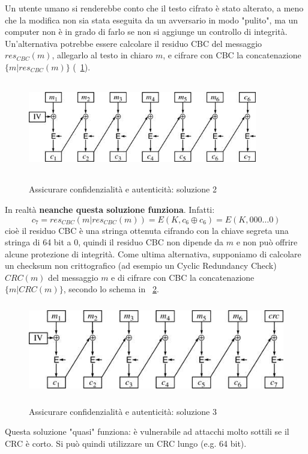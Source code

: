 \newline \newline
Un utente umano si renderebbe conto che il testo cifrato è stato alterato, a meno che la modifica non sia stata eseguita da un avversario in modo "pulito", ma un computer non è in grado di farlo se non si aggiunge un controllo di integrità.
\newline \newline
Un'alternativa potrebbe essere calcolare il residuo CBC del messaggio $res_{CBC}(m)$, allegarlo al testo in chiaro $m$, e cifrare con CBC la concatenazione $\{ m|res_{CBC}(m) \}$ (\figurename ~\ref{fig:residuo_CBC_2}).
\begin{figure}[htbp]
	\centering%
	\subfigure%
	{\includegraphics[height=4cm, width=10cm, keepaspectratio]{Immagini/modalita_operative/residuo_CBC_2.png}}
	\caption{Assicurare confidenzialità e autenticità: soluzione 2 \label{fig:residuo_CBC_2}} 	
\end{figure}
In realtà \textbf{neanche questa soluzione funziona}. Infatti: 
\begin{equation}
c_{7} = res_{CBC}(m|res_{CBC}(m)) = E(K, c_{6} \oplus c_{6}) = E(K, 000 … 0)
\end{equation}
cioè il residuo CBC è una stringa ottenuta cifrando con la chiave segreta una stringa di 64 bit a 0, quindi il residuo CBC non dipende da $m$ e non può offrire alcune protezione di integrità.
\newline \newline
Come ultima alternativa, supponiamo di calcolare un checksum non crittografico (ad esempio un Cyclic Redundancy Check) $CRC(m)$ del messaggio $m$ e di cifrare con CBC la concatenazione $\{ m| CRC(m) \}$, secondo lo schema in \figurename~\ref{fig:residuo_CBC_3}.
\begin{figure}[htbp]
	\centering%
	\subfigure%
	{\includegraphics[height=4cm, width=12cm, keepaspectratio]{Immagini/modalita_operative/residuo_CBC_3.png}}
	\caption{Assicurare confidenzialità e autenticità: soluzione 3 \label{fig:residuo_CBC_3}} 	
\end{figure}
Questa soluzione "quasi" funziona: è vulnerabile ad attacchi molto sottili se il CRC è corto. Si può quindi utilizzare un CRC lungo (e.g. 64 bit).
